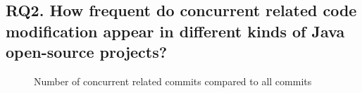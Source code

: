 \documentclass[conference]{IEEEtran}
\begin{document}
\subsection{RQ2. How frequent do concurrent related code modification appear in different kinds of Java open-source projects?}

\begin{figure}
\centering
{}
\caption{Number of concurrent related commits compared to all commits}
\end{figure}
\end{document}
